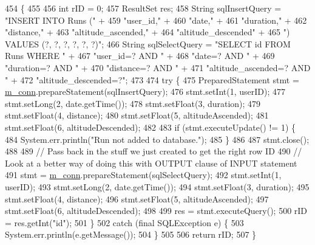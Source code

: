 \begin{DoxyCode}
454                                                                                    \{
455 
456         \textcolor{keywordtype}{int} rID = 0;
457         ResultSet res;
458         String sqlInsertQuery = \textcolor{stringliteral}{"INSERT INTO Runs ("} +
459                 \textcolor{stringliteral}{"user\_id,"} +
460                 \textcolor{stringliteral}{"date,"} +
461                 \textcolor{stringliteral}{"duration,"} +
462                 \textcolor{stringliteral}{"distance,"} +
463                 \textcolor{stringliteral}{"altitude\_ascended,"} +
464                 \textcolor{stringliteral}{"altitude\_descended"} +
465                 \textcolor{stringliteral}{") VALUES (?, ?, ?, ?, ?, ?)"};
466         String sqlSelectQuery = \textcolor{stringliteral}{"SELECT id FROM Runs WHERE "} +
467                 \textcolor{stringliteral}{"user\_id=? AND "} +
468                 \textcolor{stringliteral}{"date=? AND "} +
469                 \textcolor{stringliteral}{"duration=? AND "} +
470                 \textcolor{stringliteral}{"distance=? AND "} +
471                 \textcolor{stringliteral}{"altitude\_ascended=? AND "} +
472                 \textcolor{stringliteral}{"altitude\_descended=?"};
473 
474         \textcolor{keywordflow}{try} \{
475             PreparedStatement stmt = \mbox{\hyperlink{classcom_1_1activitytracker_1_1_d_b_manager_a064088d13ac09eb147fdc19268771521}{m\_conn}}.prepareStatement(sqlInsertQuery);
476             stmt.setInt(1, userID);
477             stmt.setLong(2, date.getTime());
478             stmt.setFloat(3, duration);
479             stmt.setFloat(4, distance);
480             stmt.setFloat(5, altitudeAscended);
481             stmt.setFloat(6, altitudeDescended);
482 
483             \textcolor{keywordflow}{if} (stmt.executeUpdate() != 1) \{
484                 System.err.println(\textcolor{stringliteral}{"Run not added to database."});
485             \}
486 
487             stmt.close();
488 
489             \textcolor{comment}{// Pass back in the stuff we just created to get the right row ID}
490             \textcolor{comment}{// Look at a better way of doing this with OUTPUT clause of INPUT statement}
491             stmt = \mbox{\hyperlink{classcom_1_1activitytracker_1_1_d_b_manager_a064088d13ac09eb147fdc19268771521}{m\_conn}}.prepareStatement(sqlSelectQuery);
492             stmt.setInt(1, userID);
493             stmt.setLong(2, date.getTime());
494             stmt.setFloat(3, duration);
495             stmt.setFloat(4, distance);
496             stmt.setFloat(5, altitudeAscended);
497             stmt.setFloat(6, altitudeDescended);
498 
499             res = stmt.executeQuery();
500             rID = res.getInt(\textcolor{stringliteral}{"id"});
501         \}
502         \textcolor{keywordflow}{catch} (\textcolor{keyword}{final} SQLException e) \{
503             System.err.println(e.getMessage());
504         \}
505 
506         \textcolor{keywordflow}{return} rID;
507     \}
\end{DoxyCode}
